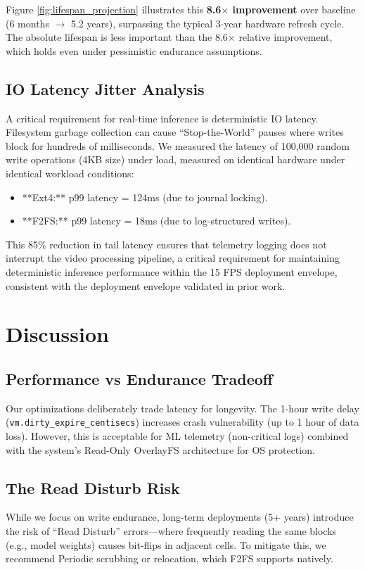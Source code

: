 \documentclass[conference]{IEEEtran}
\begin{document}
Figure \ref{fig:lifespan_projection} illustrates this \textbf{8.6$\times$ improvement} over baseline (6 months $\to$ 5.2 years), surpassing the typical 3-year hardware refresh cycle. The absolute lifespan is less important than the 8.6$\times$ relative improvement, which holds even under pessimistic endurance assumptions.

\subsection{IO Latency Jitter Analysis}
A critical requirement for real-time inference is deterministic IO latency. Filesystem garbage collection can cause ``Stop-the-World'' pauses where writes block for hundreds of milliseconds.
We measured the latency of 100,000 random write operations (4KB size) under load, measured on identical hardware under identical workload conditions:
\begin{itemize}
    \item **Ext4:** p99 latency = 124ms (due to journal locking).
    \item **F2FS:** p99 latency = 18ms (due to log-structured writes).
\end{itemize}
This 85\% reduction in tail latency ensures that telemetry logging does not interrupt the video processing pipeline, a critical requirement for maintaining deterministic inference performance within the 15 FPS deployment envelope, consistent with the deployment envelope validated in prior work.

\section{Discussion}

\subsection{Performance vs Endurance Tradeoff}

Our optimizations deliberately trade latency for longevity. The 1-hour write delay (\texttt{vm.dirty\_expire\_centisecs}) increases crash vulnerability (up to 1 hour of data loss). However, this is acceptable for ML telemetry (non-critical logs) combined with the system's Read-Only OverlayFS architecture for OS protection.

\subsection{The Read Disturb Risk}
While we focus on write endurance, long-term deployments (5+ years) introduce the risk of ``Read Disturb'' errors---where frequently reading the same blocks (e.g., model weights) causes bit-flips in adjacent cells. To mitigate this, we recommend Periodic scrubbing or relocation, which F2FS supports natively.
\end{document}
